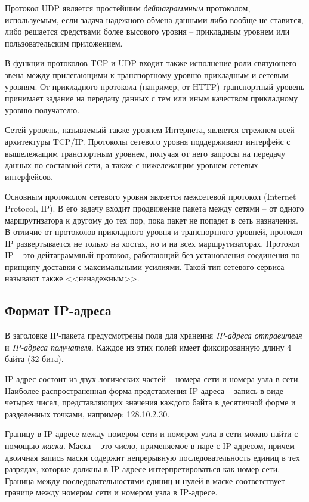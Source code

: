 \documentclass[%
	11pt,
	a4paper,
	utf8,
		]{article}
\begin{document}
Протокол UDP является простейшим \emph{дейтаграммным} протоколом, используемым, если задача надежного обмена данными либо вообще не ставится, либо решается средствами более высокого уровня -- прикладным уровнем или пользовательским приложением.

В функции протоколов TCP и UDP входит также исполнение роли связующего звена между прилегающими к транспортному уровню прикладным и сетевым уровням. От прикладного протокола (например, от HTTP) транспортный уровень принимает задание на передачу данных с тем или иным качеством прикладному уровню-получателю.

Сетей уровень, называемый также уровнем Интернета, является стрежнем всей архитектуры TCP/IP. Протоколы сетевого уровня поддерживают интерфейс с вышележащим транспортным уровнем, получая от него запросы на передачу данных по составной сети, а также с нижележащим уровнем сетевых интерфейсов.

Основным протоколом сетевого уровня является межсетевой протокол (Internet Protocol, IP). В его задачу входит продвижение пакета между сетями -- от одного маршрутизатора к другому до тех пор, пока пакет не попадет в сеть назначения. В отличие от протоколов прикладного уровня и транспортного уровней, протокол IP развертывается не только на хостах, но и на всех маршрутизаторах. Протокол IP -- это дейтаграммный протокол, работающий без установления соединения по принципу доставки с максимальными усилиями. Такой тип сетевого сервиса называют также <<ненадежным>>.

\subsection{Формат IP-адреса}

В заголовке IP-пакета предусмотрены поля для хранения \emph{IP-адреса отправителя} и \emph{IP-адреса получателя}. Каждое из этих полей имеет фиксированную длину 4 байта (32 бита).

IP-адрес состоит из двух логических частей -- номера сети и номера узла в сети. Наиболее распространенная форма представления IP-адреса -- запись в виде четырех чисел, представляющих значения каждого байта в десятичной форме и разделенных точками, например: 128.10.2.30.

Границу в IP-адресе между номером сети и номером узла в сети можно найти с помощью \emph{маски}. Маска -- это число, применяемое в паре с IP-адресом, причем двоичная запись маски содержит непрерывную последовательность единиц в тех разрядах, которые должны в IP-адресе интерпретироваться как номер сети. Граница между последовательностями единиц и нулей в маске соответствует границе между номером сети и номером узла в IP-адресе.
\end{document}
